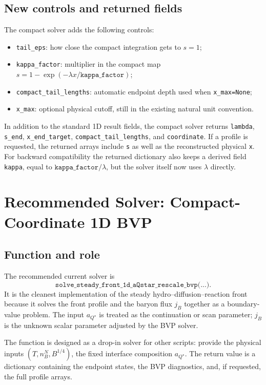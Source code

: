 \documentclass[11pt]{article}
\begin{document}
\subsection{New controls and returned fields}
The compact solver adds the following controls:
\begin{itemize}[leftmargin=1.5em]
\item \texttt{tail\_eps}: how close the compact integration gets to $s=1$;
\item \texttt{kappa\_factor}: multiplier in the compact map
      $s=1-\exp(-\lambda x/\texttt{kappa\_factor})$;
\item \texttt{compact\_tail\_lengths}: automatic endpoint depth used when
      \texttt{x\_max=None};
\item \texttt{x\_max}: optional physical cutoff, still in the existing natural
      unit convention.
\end{itemize}
In addition to the standard 1D result fields, the compact solver returns
\texttt{lambda}, \texttt{s\_end}, \texttt{x\_end\_target},
\texttt{compact\_tail\_lengths}, and \texttt{coordinate}. If a profile is
requested, the returned arrays include \texttt{s} as well as the reconstructed
physical \texttt{x}. For backward compatibility the returned dictionary also
keeps a derived field \texttt{kappa}, equal to
$\texttt{kappa\_factor}/\lambda$, but the solver itself now uses $\lambda$
directly.

\fi


\section{Recommended Solver: Compact-Coordinate 1D BVP}
\subsection{Function and role}
The recommended current solver is
\[
\texttt{solve\_steady\_front\_1d\_aQstar\_rescale\_bvp(...)}.
\]
It is the cleanest implementation of the steady hydro--diffusion--reaction
front because it solves the front profile and the baryon flux $j_B$ together as
a boundary-value problem. The input $a_{Q^\star}$ is treated as the continuation
or scan parameter; $j_B$ is the unknown scalar parameter adjusted by the BVP
solver.

The function is designed as a drop-in solver for other scripts: provide the
physical inputs $(T,n_B^N,B^{1/4})$, the fixed interface composition
$a_{Q^\star}$. The return
value is a dictionary containing the endpoint states, the BVP diagnostics, and,
if requested, the full profile arrays.
\end{document}
